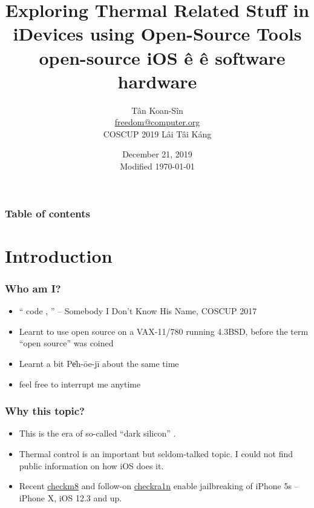 \documentclass{beamer}
\begin{document}
\title{Exploring Thermal Related Stuff in iDevices using Open-Source Tools \\
  \ open-source     iOS ê      \^e software  hardware}

\author[freedom]{T\^an Koan-S\^in \\ \href{mailto:freedom@computer.org}{freedom@computer.org} \\ COSCUP 2019 Lâi Tâi Káng}
\date{December 21, 2019 \\ Modified \today}

\begin{frame}
  \titlepage
\end{frame}

\begin{frame}
  \frametitle{Table of contents}
  \tableofcontents
\end{frame}

\section{Introduction}
\begin{frame}
  \frametitle{Who am I?}
  \begin{itemize}
  \item ``    code  ,    '' -- Somebody I Don't Know His Name, COSCUP 2017
  \item Learnt to use open source on a VAX-11/780 running 4.3BSD, before the term ``open source'' was coined
  \item Learnt a bit Pe̍h-ōe-jī about the same time
  \item feel free to interrupt me anytime
  \end{itemize}
\end{frame}

\begin{frame}
  \frametitle{Why this topic?}
  \begin{itemize}
  \item This is the era of so-called ``dark silicon'' \cite{Esmaeilzadeh:2011:DSE:2000064.2000108}.
  \item Thermal control is an important but seldom-talked topic. I could not find public information on how iOS does it.
  \item Recent \href{https://github.com/axi0mX/ipwndfu}{checkm8} \cite{checkm8} and follow-on \href{https://checkra.in/}{checkra1n} \cite{checkra1n} enable jailbreaking of iPhone 5s – iPhone X, iOS 12.3 and up.
  \end{itemize}
\end{frame}
\end{document}

